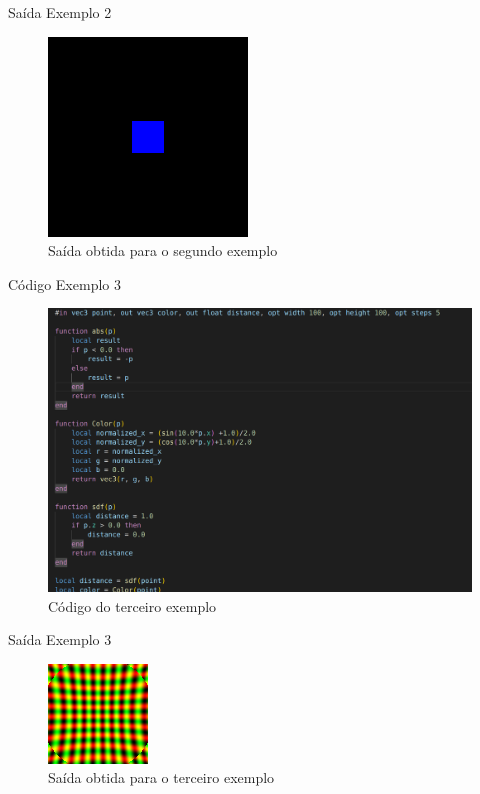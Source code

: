 \documentclass[2pt]{beamer} %
\begin{document}
\begin{frame}{Saída Exemplo 2}
    \begin{figure}
        \centering
        \includegraphics[width=0.5\linewidth]{imgs/cube.png}
        \caption{Saída obtida para o segundo exemplo}
        \label{fig:enter-label}
    \end{figure}
\end{frame}

\begin{frame}{Código Exemplo 3}
    \begin{figure}
        \centering
        \includegraphics[width=0.7\linewidth]{imgs/exemplo3.png}
        \caption{Código do terceiro exemplo}
        \label{fig:enter-label}
    \end{figure}
\end{frame}



\begin{frame}{Saída Exemplo 3}
\begin{figure}
    \centering
    \includegraphics[width=0.5\linewidth]{imgs/canvas.png}
    \caption{Saída obtida para o terceiro exemplo}
    \label{fig:enter-label}
\end{figure}
    
\end{frame}
\end{document}

